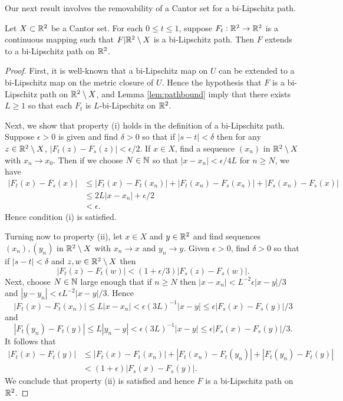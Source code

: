 \documentclass{amsart}
\begin{document}
Our next result involves the removability of a Cantor set for a bi-Lipschitz path.

\begin{proposition}
\label{prop:remov}
Let $X \subset \mathbb{R}^2$ be a Cantor set.
For each $0\leq t\leq 1$, suppose $F_t:\mathbb{R}^2 \to \mathbb{R}^2$ is a continuous mapping such that $F|\mathbb{R}^2 \setminus X$ is a bi-Lipschitz path. Then $F$ extends to a bi-Lipschitz path on $\mathbb{R}^2$.
\end{proposition}


\begin{proof}
First, it is well-known that a bi-Lipschitz map on $U$ can be extended to a bi-Lipschitz map on the metric closure of $U$.
Hence the hypothesis that $F$ is a bi-Lipschitz path on $\mathbb{R}^2 \setminus X$, and Lemma \ref{lem:pathbound} imply that there exists $L\geq 1$ so that each $F_t$ is $L$-bi-Lipschitz on $\mathbb{R}^2$.

Next, we show that property (i) holds in the definition of a bi-Lipschitz path. Suppose $\epsilon >0$ is given and find $\delta >0$ so that if $|s-t| < \delta$ then for any $z \in \mathbb{R}^2 \setminus X$, $|F_t(z) - F_s(z)| <\epsilon /2$. If $x\in X$, find a sequence $(x_n)$ in $\mathbb{R}^2 \setminus X$ with $x_n \to x_0$. Then if we choose $N\in \mathbb{N}$ so that $|x-x_n| < \epsilon /4L$ for $n \geq N$, we have
\begin{align*}
|F_t(x) - F_s(x) | & \leq |F_t(x) - F_t(x_n)| + |F_t(x_n) - F_s(x_n)| + | F_s(x_n) - F_s(x)| \\
&\leq 2L|x-x_n| + \epsilon /2 \\
&< \epsilon .
\end{align*}
Hence condition (i) is satisfied.

Turning now to property (ii), let $x\in X$ and $y\in \mathbb{R}^2$ and find sequences $(x_n), (y_n)$ in $\mathbb{R}^2 \setminus X$ with $x_n \to x$ and $y_n \to y$. Given $\epsilon >0$, find $\delta >0$ so that if $|s-t| <\delta$ and $z,w \in \mathbb{R}^2 \setminus X$ then 
\[ |F_t(z) - F_t(w)| < (1+\epsilon / 3) | F_s(z) - F_s(w)|.\]
Next, choose $N\in \mathbb{N}$ large enough that if $n\geq N$ then $|x-x_n| < L^{-2}\epsilon |x-y| / 3$ and $|y-y_n| < \epsilon L^{-2} |x-y| / 3$. Hence
\[ |F_t(x) - F_t(x_n) | \leq L|x-x_n| < \epsilon(3L)^{-1} |x-y| \leq \epsilon|F_s(x) - F_s(y)|/3\]
and
\[ |F_t(y_n) - F_t(y)| \leq L | y_n-y| < \epsilon(3L)^{-1} |x-y| \leq \epsilon |F_s(x) - F_s(y)|/3.\]
It follows that
\begin{align*}
|F_t(x) - F_t(y)| &\leq |F_t(x) - F_t(x_n) | + |F_t(x_n) - F_t(y_n)| + |F_t(y_n) - F_t(y)| \\
&< ( 1+ \epsilon ) | F_s(x) - F_s(y) |.
\end{align*}
We conclude that property (ii) is satisfied and hence $F$ is a bi-Lipschitz path on $\mathbb{R}^2$.
\end{proof}
\end{document}
